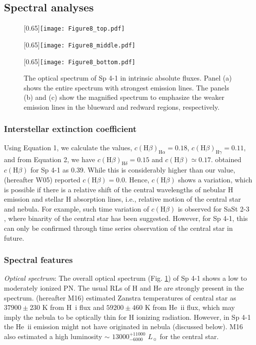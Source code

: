 \documentclass[a4paper,fleqn,usenatbib]{mnras}
\begin{document}
\subsection{Spectral analyses}

\begin{figure}
\centering
\scalebox{0.65}[0.65]{\texttt{[image: Figure8\_top.pdf]}}

\scalebox{0.65}[0.65]{\texttt{[image: Figure8\_middle.pdf]}}

\scalebox{0.65}[0.65]{\texttt{[image: Figure8\_bottom.pdf]}}
 \caption{The optical spectrum of Sp 4-1 in intrinsic absolute fluxes. Panel (a) shows the entire spectrum with strongest emission lines. The panels (b) and (c) show the magnified spectrum to emphasize the weaker emission lines in the blueward and redward regions, respectively. \label{fig:specoptsp4-1}}
\end{figure}

\subsubsection{Interstellar extinction coefficient}
Using Equation 1, we calculate the values, $c(\mathrm{H}\beta)_{\mathrm{H}\alpha}=0.18$, $c(\mathrm{H}\beta)_{\mathrm{H}\gamma}=0.11$, and from Equation 2, we have $c(\mathrm{H}\beta)_{\mathrm{H}\delta}=0.15$ and $c(\mathrm{H}\beta)\simeq0.17$. \citet{1992A&AS...95..337T} obtained $c(\mathrm{H}\beta)$ for Sp 4-1 as 0.39. While this is considerably higher than our value, \citet{2005MNRAS.362..424W} (hereafter W05) reported $c(\mathrm{H}\beta)=0.0$. Hence,  $c(\mathrm{H}\beta)$ shows a variation, which is possible if there is a relative shift of the central wavelengths of nebular H emission and stellar H absorption lines, i.e., relative motion of the central star and nebula. For example, such time variation of $c(\mathrm{H}\beta)$ is observed for SaSt 2-3 \citep{2019MNRAS.482.2354O}, where binarity of the central star has been suggested. However, for Sp 4-1, this can only be confirmed through time series observation of the central star in future. 

\subsubsection{Spectral features} \label{sec:specsp4-1}
{\textit{Optical spectrum}:} The overall optical spectrum (Fig. \ref{fig:specoptsp4-1}) of Sp 4-1 shows a low to moderately ionized PN. The usual RLs of H and He are strongly present in the spectrum. \citet{2016A&A...593A..29M} (hereafter M16) estimated Zanstra temperatures of central star as $37900\pm230$ K from H~{\sc i} flux and $59200\pm460$ K from He~{\sc ii} flux, which may imply the nebula to be optically thin for H ionizing radiation. However, in Sp 4-1 the He~{\sc ii} emission might not have originated in nebula (discussed below). M16 also estimated a high luminosity $\sim$ $13000^{+11000}_{-6000}$ $L_{\sun}$ for the central star. 
\end{document}
